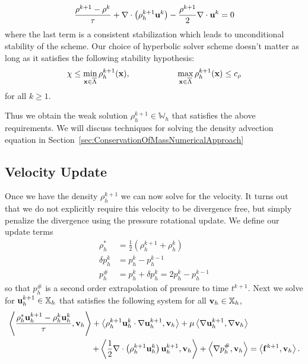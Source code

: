 \documentclass[letterpaper]{erdc}
\begin{document}
\begin{equation}
  \frac{\rho^{k+1} - \rho^k}{\tau} + \nabla\cdot\left(\rho_h^{k+1}\textbf{u}^{k} \right) - \frac{\rho^{k+1}}{2}\nabla\cdot\textbf{u}^{k} = 0
\end{equation}
where the last term is a consistent stabilization which leads to unconditional
stability of the scheme.  Our choice of hyperbolic solver scheme doesn't matter
as long as it satisfies the following stability hypothesis:
\begin{equation}
  \chi \leq \displaystyle\min_{\textbf{x}\in\overline{\Lambda}} \rho_h^{k+1}(\textbf{x}), \hspace{2cm} \displaystyle\max_{\textbf{x}\in\overline{\Lambda}} \rho_{h}^{k+1}(\textbf{x}) \leq c_{\rho}
\end{equation}
for all $k\geq 1$.

Thus we obtain the weak solution $\rho_h^{k+1}\in \mathbb{W}_h$ that satisfies
the above requirements.  We will discuss techniques for solving the density
advection equation in Section~\ref{sec:ConservationOfMassNumericalApproach}

%
%
\subsection{Velocity Update}

Once we have the density $\rho_h^{k+1}$ we can now solve for the velocity.  It
turns out that we do not explicitly require this velocity to be divergence
free, but simply penalize the divergence using the pressure rotational update.
We define our update terms
\begin{align*}
  \rho_h^{*} &= \frac{1}{2}\left( \rho_h^{k+1} + \rho_h^{k} \right)\\
  \delta p_h^{k} &= p_h^{k} - p_h^{k-1}\\
    p_h^{\#} &= p_h^{k} + \delta p_h^{k} = 2p_h^{k} - p_h^{k-1}
\end{align*}
so that $p_h^{\#}$ is a second order extrapolation of pressure to time
$t^{k+1}$.  Next we solve for $\textbf{u}_h^{k+1}\in\mathbb{X}_h$ that satisfies the
following system for all $\textbf{v}_h\in\mathbb{X}_h$,
\begin{equation}\label{eqn:bdf1_momentum_constanttimestep}
  \begin{split}
\left\langle  \frac{\rho_h^{*}\textbf{u}_h^{k+1}-\rho_h^{k}\textbf{u}_h^{k} }{\tau} , \textbf{v}_h \right\rangle + \left\langle  \rho_h^{k+1}\textbf{u}_h^{k}\cdot\nabla\textbf{u}_h^{k+1} , \textbf{v}_h \right\rangle+ \mu\left\langle  \nabla \textbf{u}_h^{k+1} , \nabla\textbf{v}_h \right\rangle&\\
 + \left\langle  \frac{1}{2}\nabla\cdot\left(\rho_h^{k+1}\textbf{u}_h^{k}\right)\textbf{u}_h^{k+1} , \textbf{v}_h \right\rangle +\left\langle \nabla p_h^{\#}, \textbf{v}_h \right\rangle &= \left\langle \mathbf{f}^{k+1}, \textbf{v}_h \right\rangle.
\end{split}
\end{equation}
\end{document}
